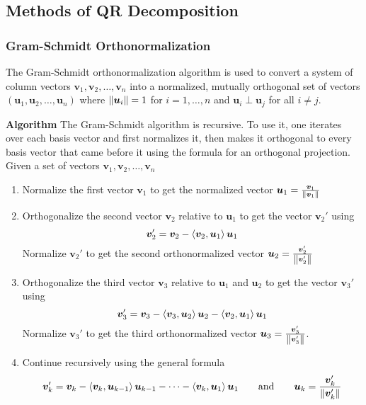 \documentclass[11pt, a4paper]{article}
\begin{document}
\subsection{Methods of QR Decomposition}

\subsubsection{Gram-Schmidt Orthonormalization}
The Gram-Schmidt orthonormalization algorithm is used to convert a system of column vectors $ \bm{v}_1, \bm{v}_2, \dots, \bm{v}_n $ into a normalized, mutually orthogonal set of vectors $ (\bm{u}_1, \bm{u}_2, \dots, \bm{u}_n) $ where $ \norm{\bm{u}_i} = 1 $ for $ i = 1, \dots, n $ and $ \bm{u}_i \perp \bm{u}_j  $ for all $ i \neq j $.

\textbf{Algorithm}
The Gram-Schmidt algorithm is recursive. To use it, one iterates over each basis vector and first normalizes it, then makes it orthogonal to every basis vector that came before it using the formula for an orthogonal projection. Given a set of vectors $ \bm{v}_1, \bm{v}_2, \dots, \bm{v}_n $
\begin{enumerate}
	\item Normalize the first vector $ \bm{v}_1 $ to get the normalized vector $ \bm{u}_1 = \frac{\bm{v}_1}{\norm{\bm{v}_1}}$

	\item Orthogonalize the second vector $ \bm{v}_2 $ relative to $ \bm{u}_{1} $ to get the vector $ \bm{v}_{2}' $ using
	\begin{equation*}
		\bm{v}_{2}' = \bm{v}_2 - \expval{\bm{v}_2,\bm{u}_1} \bm{u}_1
	\end{equation*}
	Normalize $ \bm{v}_{2}' $ to get the second orthonormalized vector $ \bm{u}_2 = \frac{\bm{v}_{2}'}{\norm{\bm{v}_{2}'}}$ 
	
	\item Orthogonalize the third vector $ \bm{v}_3 $ relative to $ \bm{u}_{1} $ and $ \bm{u}_{2} $ to get the vector $ \bm{v}_{3}' $ using
	\begin{equation*}
		\bm{v}_{3}' = \bm{v}_3 -  \expval{\bm{v}_3, \bm{u}_2}  \bm{u}_2 - \expval{\bm{v}_2, \bm{u}_1} \bm{u}_1
	\end{equation*}
	Normalize $ \bm{v}_{3}' $ to get the third orthonormalized vector $ \bm{u}_3 = \frac{\bm{v}_{3}'}{\norm{\bm{v}_{3}'}}$.

	\item Continue recursively using the general formula
	\begin{equation*}
		\bm{v}_{k}' = \bm{v}_k - \expval{\bm{v}_k, \bm{u}_{k-1}} \bm{u}_{k-1} - \dots - \expval{\bm{v}_k, \bm{u}_1} \bm{u}_1 \qquad \text{and} \qquad \bm{u}_k = \frac{\bm{v}_{k}'}{\norm{\bm{v}_{k}'}}
	\end{equation*}

\end{enumerate}
\end{document}
